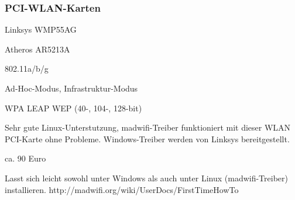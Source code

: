 \subsubsection{PCI-WLAN-Karten}

\begin{wlandevice}{Linksys WMP55AG}

\wlanchipset
Atheros AR5213A

\wlanieeestandard
802.11a/b/g

\wlanmode
Ad-Hoc-Modus, Infrastruktur-Modus

\wlansecurity
 WPA
 LEAP
 WEP (40-, 104-, 128-bit)

\wlandriver
 Sehr gute Linux-Unterstutzung, madwifi-Treiber funktioniert
 mit dieser WLAN PCI-Karte ohne Probleme.
 Windows-Treiber werden von Linksys bereitgestellt.

\wlanprice
 ca. 90 Euro

\wlaninstall
 Lasst sich leicht sowohl unter Windows als auch unter Linux (madwifi-Treiber) installieren.
 http://madwifi.org/wiki/UserDocs/FirstTimeHowTo

 \end{wlandevice}
